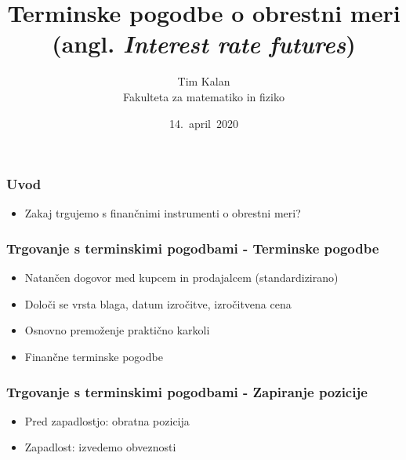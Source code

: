 \documentclass[14pt]{beamer}
\author{Tim Kalan \\ 
    Fakulteta za matematiko in fiziko}
\title{
    Terminske pogodbe o obrestni meri \\ 
    \large (angl. \textit{Interest rate futures})}
\date{14.\ april\ 2020}
\begin{document}
\begin{frame}
    \titlepage
\end{frame}


\begin{frame}
    \frametitle{Uvod}

    \begin{itemize}
        \item Zakaj trgujemo s finančnimi instrumenti o obrestni meri?
        
    \end{itemize}


\end{frame}




\begin{frame}
    \frametitle{Trgovanje s terminskimi pogodbami - Terminske pogodbe}
    
    \begin{itemize}
        \item Natančen dogovor med kupcem in prodajalcem (standardizirano)
        \item Določi se vrsta blaga, datum izročitve, izročitvena cena
        \item Osnovno premoženje praktično karkoli 
        \item Finančne terminske pogodbe
    \end{itemize}


\end{frame}


\begin{frame}
    \frametitle{Trgovanje s terminskimi pogodbami - Zapiranje pozicije}
    
    \begin{itemize}
        \item Pred zapadlostjo: obratna pozicija
        \item Zapadlost: izvedemo obveznosti
    \end{itemize}


\end{frame}
\end{document}
